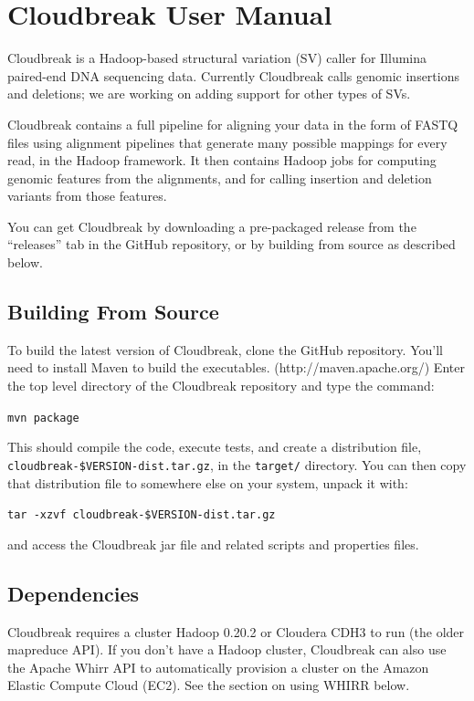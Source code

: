 \documentclass[11pt]{article}
\begin{document}
\newpage

\section{Cloudbreak User Manual}
\label{cloudbreak}

Cloudbreak is a Hadoop-based structural variation (SV) caller for Illumina
paired-end DNA sequencing data. Currently Cloudbreak calls genomic insertions
and deletions; we are working on adding support for other types of SVs.

Cloudbreak contains a full pipeline for aligning your data in the form of FASTQ
files using alignment pipelines that generate many possible mappings for every
read, in the Hadoop framework. It then contains Hadoop jobs for computing
genomic features from the alignments, and for calling insertion and deletion
variants from those features.

You can get Cloudbreak by downloading a pre-packaged release from the ``releases''
tab in the GitHub repository, or by building from source as described below.

\subsection{Building From Source}
\label{buildingfromsource}

To build the latest version of Cloudbreak, clone the GitHub repository. You'll
need to install Maven to build the executables. (http:/\slash maven.apache.org\slash )
Enter the top level directory of the Cloudbreak repository and type the command:

\texttt{mvn package}

This should compile the code, execute tests, and create a distribution file, \linebreak
 \texttt{cloudbreak-\$VERSION-dist.tar.gz}, in the \texttt{target\slash } directory. You can then copy
 that distribution file to somewhere else on your system, unpack it with:

 \texttt{tar -xzvf cloudbreak-\$VERSION-dist.tar.gz} 

and access the Cloudbreak jar file and related scripts and properties files.

\subsection{Dependencies}
\label{dependencies}

Cloudbreak requires a cluster Hadoop 0.20.2 or Cloudera CDH3 to run (the older
mapreduce API). If you don't have a Hadoop cluster, Cloudbreak can also use the
Apache Whirr API to automatically provision a cluster on the Amazon Elastic
Compute Cloud (EC2). See the section on using WHIRR below.
\end{document}

